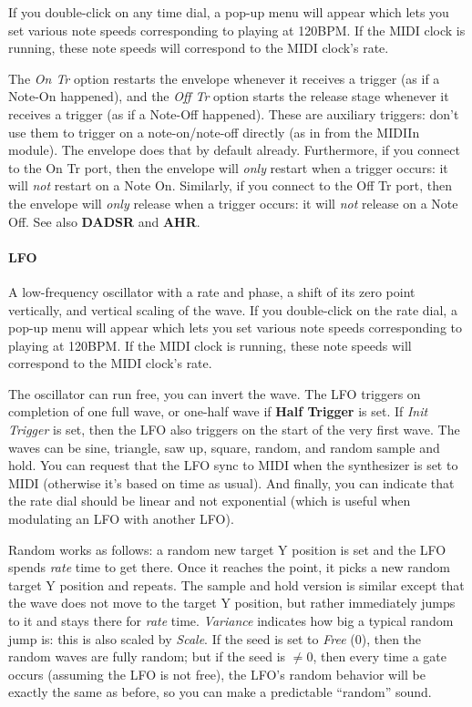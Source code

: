 \documentclass{article}
\begin{document}
If you double-click on any time dial, a pop-up menu will appear which lets you set various note speeds corresponding to playing at 120BPM.  If the MIDI clock is running, these note speeds will correspond to the MIDI clock's rate.

The {\it On Tr} option restarts the envelope whenever it receives a trigger (as if a Note-On happened), and the {\it Off Tr} option starts the release stage whenever it receives a trigger (as if a Note-Off happened).  These are auxiliary triggers: don't use them to trigger on a note-on/note-off directly (as in from the MIDIIn module).  The envelope does that by default already.  Furthermore, if you connect to the On Tr port, then the envelope will {\it only} restart when a trigger occurs: it will {\it not} restart on a Note On.  Similarly, if you connect to the Off Tr port, then the envelope will {\it only} release when a trigger occurs: it will {\it not} release on a Note Off.   See also {\bf DADSR} and {\bf AHR}.

\paragraph{LFO}  A low-frequency oscillator with a rate and phase, a shift of its zero point vertically, and vertical scaling of the wave.   If you double-click on the rate dial, a pop-up menu will appear which lets you set various note speeds corresponding to playing at 120BPM.  If the MIDI clock is running, these note speeds will correspond to the MIDI clock's rate.

The oscillator can run free, you can invert the wave.    The LFO triggers on completion of one full wave, or one-half wave if {\bf Half Trigger} is set.  If {\it Init Trigger} is set, then the LFO also triggers on the start of the very first wave.  The waves can be sine, triangle, saw up, square, random, and random sample and hold.   You can request that the LFO sync to MIDI when the synthesizer is set to MIDI (otherwise it's based on time as usual).  And finally, you can indicate that the rate dial should be linear and not exponential (which is useful when modulating an LFO with another LFO).

Random works as follows: a random new target Y position is set and the LFO spends {\it rate} time to get there.  Once it reaches the point, it picks a new random target Y position and repeats.  The sample and hold version is similar except that the wave does not move to the target Y position, but rather immediately jumps to it and stays there for {\it rate} time.   {\it Variance} indicates how big a typical random jump is: this is also scaled by {\it Scale}.  If the seed is set to {\it Free} (0), then the random waves are fully random; but if the seed is \(\neq 0\), then every time a gate occurs (assuming the LFO is not free), the LFO's random behavior will be exactly the same as before, so you can make a predictable ``random'' sound.
\end{document}

